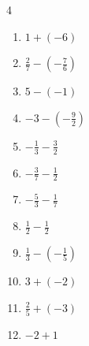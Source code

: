 \begin{multicols}{4}
\begin{enumerate}
  \item $\displaystyle 1 + \left(-6\right)$

        \phantom{$\displaystyle =-5$}

  \item $\displaystyle \frac{2}{7} - \left(-\frac{7}{6}\right)$


  \item $\displaystyle 5 - \left(-1\right)$

        \phantom{$\displaystyle =6$}

  \item $\displaystyle -3 - \left(-\frac{9}{2}\right)$


  \item $\displaystyle -\frac{1}{3} - \frac{3}{2}$


\columnbreak %

  \item $\displaystyle -\frac{3}{7} - \frac{1}{2}$


  \item $\displaystyle -\frac{5}{3} - \frac{1}{7}$


  \item $\displaystyle \frac{1}{2} - \frac{1}{2}$

        \phantom{$\displaystyle =0$}

  \item $\displaystyle \frac{1}{3} - \left(-\frac{1}{5}\right)$


  \item $\displaystyle 3 + \left(-2\right)$

        \phantom{$\displaystyle =1$}

  \item $\displaystyle \frac{2}{5} + \left(-3\right)$


  \item $\displaystyle -2 + 1$

        \phantom{$\displaystyle =-1$}


\end{enumerate}
\end{multicols}
